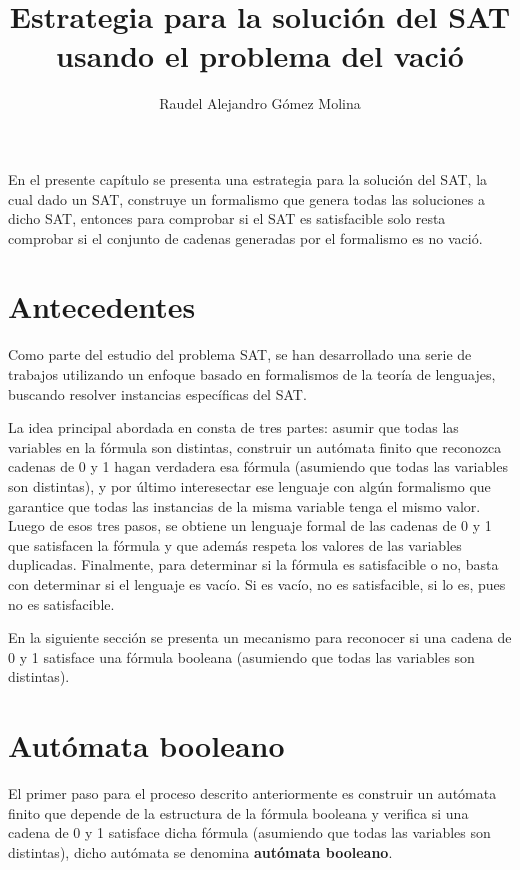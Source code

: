 \documentclass[12pt]{article}
\title{Estrategia para la solución del SAT usando el problema del vació}
\author{Raudel Alejandro Gómez Molina}
\begin{document}
\maketitle

En el presente capítulo se presenta una estrategia para la solución del SAT, la cual dado un SAT, construye un formalismo
que genera todas las soluciones a dicho SAT, entonces para comprobar si el SAT es satisfacible solo resta comprobar si el
conjunto de cadenas generadas por el formalismo es no vació.

\section{Antecedentes}

Como parte del estudio del problema SAT, se han desarrollado una serie de trabajos utilizando un enfoque
basado en formalismos de la teoría de lenguajes, buscando resolver instancias específicas del SAT.

La idea principal abordada en \cite{aCFSAT} consta de tres partes: 
asumir que todas las variables en la fórmula son distintas, construir un autómata finito que reconozca cadenas de 0 y 1 hagan 
verdadera esa fórmula (asumiendo que todas las variables son distintas), y por último interesectar ese lenguaje con algún formalismo 
que garantice que todas las instancias de la misma variable tenga el mismo valor. Luego de esos tres pasos, se obtiene un lenguaje 
formal de las cadenas de 0 y 1 que satisfacen la fórmula y que además respeta los valores de las variables duplicadas. 
Finalmente, para determinar si la fórmula es satisfacible o no, basta con determinar si el lenguaje es vacío. Si es vacío, no 
es satisfacible, si lo es, pues no es satisfacible.

En la siguiente sección se presenta un mecanismo para reconocer si una cadena de 0 y 1 satisface una fórmula booleana
(asumiendo que todas las variables son distintas).

\section{Autómata booleano}

El primer paso para el proceso descrito anteriormente es construir un autómata finito que depende de la estructura de la fórmula booleana
y verifica si una cadena de 0 y 1 satisface dicha fórmula (asumiendo que todas las variables son distintas), dicho autómata se denomina
\textbf{autómata booleano}.
\end{document}
